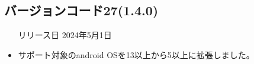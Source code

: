 \subsection*{バージョンコード27(1.4.0)}
\begin{itemize}
    \item[リリース日] 2024年5月1日
\end{itemize}

\new

\change
\begin{itemize}
    \item サポート対象のandroid OSを13以上から5以上に拡張しました。
\end{itemize}

\fix


